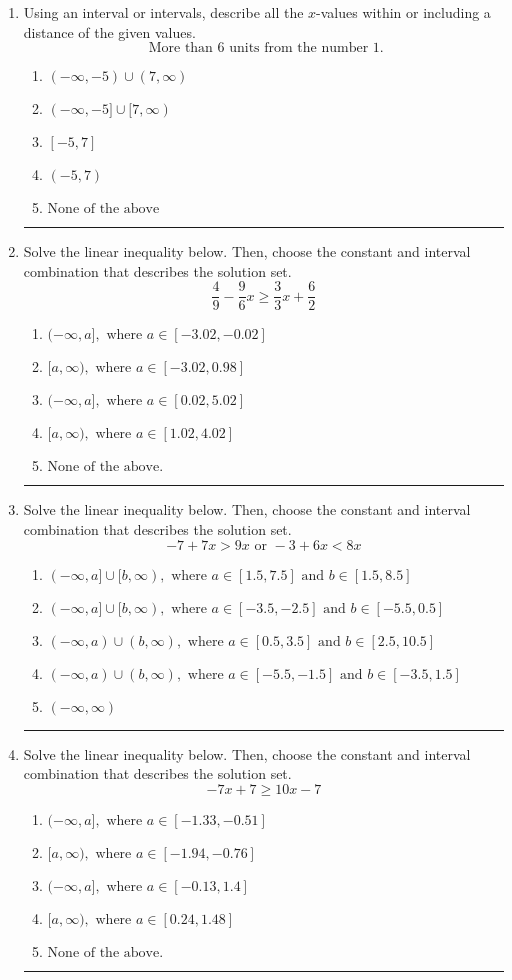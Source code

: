 \documentclass[14pt]{extbook}
\newcommand{\litem}[1]{\item#1\hspace*{-1cm}\rule{\textwidth}{0.4pt}}
\begin{document}
\begin{enumerate}
\litem{
Using an interval or intervals, describe all the $x$-values within or including a distance of the given values.\[ \text{ More than } 6 \text{ units from the number } 1. \]\begin{enumerate}[label=\Alph*.]
\item \( (-\infty, -5) \cup (7, \infty) \)
\item \( (-\infty, -5] \cup [7, \infty) \)
\item \( [-5, 7] \)
\item \( (-5, 7) \)
\item \( \text{None of the above} \)

\end{enumerate} }
\litem{
Solve the linear inequality below. Then, choose the constant and interval combination that describes the solution set.\[ \frac{4}{9} - \frac{9}{6} x \geq \frac{3}{3} x + \frac{6}{2} \]\begin{enumerate}[label=\Alph*.]
\item \( (-\infty, a], \text{ where } a \in [-3.02, -0.02] \)
\item \( [a, \infty), \text{ where } a \in [-3.02, 0.98] \)
\item \( (-\infty, a], \text{ where } a \in [0.02, 5.02] \)
\item \( [a, \infty), \text{ where } a \in [1.02, 4.02] \)
\item \( \text{None of the above}. \)

\end{enumerate} }
\litem{
Solve the linear inequality below. Then, choose the constant and interval combination that describes the solution set.\[ -7 + 7 x > 9 x \text{ or } -3 + 6 x < 8 x \]\begin{enumerate}[label=\Alph*.]
\item \( (-\infty, a] \cup [b, \infty), \text{ where } a \in [1.5, 7.5] \text{ and } b \in [1.5, 8.5] \)
\item \( (-\infty, a] \cup [b, \infty), \text{ where } a \in [-3.5, -2.5] \text{ and } b \in [-5.5, 0.5] \)
\item \( (-\infty, a) \cup (b, \infty), \text{ where } a \in [0.5, 3.5] \text{ and } b \in [2.5, 10.5] \)
\item \( (-\infty, a) \cup (b, \infty), \text{ where } a \in [-5.5, -1.5] \text{ and } b \in [-3.5, 1.5] \)
\item \( (-\infty, \infty) \)

\end{enumerate} }
\litem{
Solve the linear inequality below. Then, choose the constant and interval combination that describes the solution set.\[ -7x + 7 \geq 10x -7 \]\begin{enumerate}[label=\Alph*.]
\item \( (-\infty, a], \text{ where } a \in [-1.33, -0.51] \)
\item \( [a, \infty), \text{ where } a \in [-1.94, -0.76] \)
\item \( (-\infty, a], \text{ where } a \in [-0.13, 1.4] \)
\item \( [a, \infty), \text{ where } a \in [0.24, 1.48] \)
\item \( \text{None of the above}. \)


\end{enumerate}}
\end{enumerate}
\end{document}
